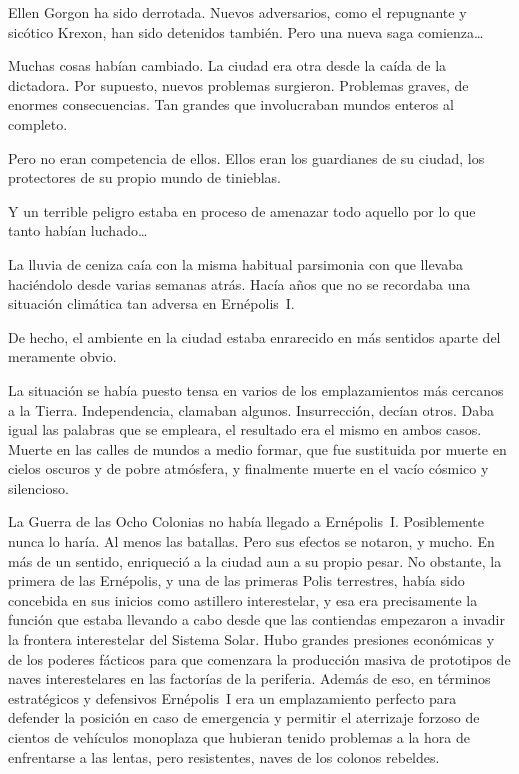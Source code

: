 \begin{prev}
    Ellen Gorgon ha sido derrotada. Nuevos adversarios, como el repugnante y sicótico Krexon, han sido detenidos también. Pero una nueva saga comienza\dots
\end{prev}

\noindent
Muchas cosas habían cambiado. La ciudad era otra desde la caída de la dictadora. Por supuesto, nuevos problemas surgieron. Problemas graves, de enormes consecuencias. Tan grandes que involucraban mundos enteros al completo.

Pero no eran competencia de ellos. Ellos eran los guardianes de su ciudad, los protectores de su propio mundo de tinieblas.

Y un terrible peligro estaba en proceso de amenazar todo aquello por lo que tanto habían luchado\dots

\bigskip\noindent
La lluvia de ceniza caía con la misma habitual parsimonia con que llevaba haciéndolo desde varias semanas atrás. Hacía años que no se recordaba una situación climática tan adversa en Ernépolis~I.

De hecho, el ambiente en la ciudad estaba enrarecido en más sentidos aparte del meramente obvio.

La situación se había puesto tensa en varios de los emplazamientos más cercanos a la Tierra. Independencia, clamaban algunos. Insurrección, decían otros. Daba igual las palabras que se empleara, el resultado era el mismo en ambos casos. Muerte en las calles de mundos a medio formar, que fue sustituida por muerte en cielos oscuros y de pobre atmósfera, y finalmente muerte en el vacío cósmico y silencioso.

La Guerra de las Ocho Colonias no había llegado a Ernépolis~I. Posiblemente nunca lo haría. Al menos las batallas. Pero sus efectos se notaron, y mucho. En más de un sentido, enriqueció a la ciudad aun a su propio pesar. No obstante, la primera de las Ernépolis, y una de las primeras Polis terrestres, había sido concebida en sus inicios como astillero interestelar, y esa era precisamente la función que estaba llevando a cabo desde que las contiendas empezaron a invadir la frontera interestelar del Sistema Solar. Hubo grandes presiones económicas y de los poderes fácticos para que comenzara la producción masiva de prototipos de naves interestelares en las factorías de la periferia. Además de eso, en términos estratégicos y defensivos Ernépolis~I era un emplazamiento perfecto para defender la posición en caso de emergencia y permitir el aterrizaje forzoso de cientos de vehículos monoplaza que hubieran tenido problemas a la hora de enfrentarse a las lentas, pero resistentes, naves de los colonos rebeldes.

